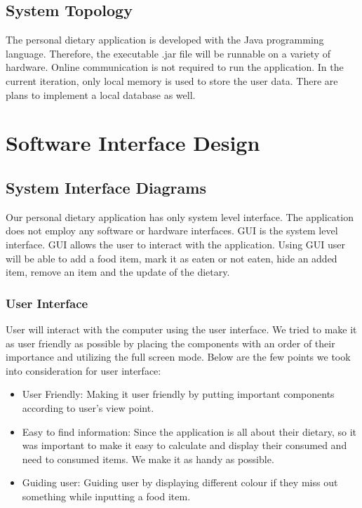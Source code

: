 \documentclass{scrreprt}
\begin{document}
\section{System Topology}

The personal dietary application is developed with the Java programming language. Therefore, the executable .jar file will be runnable on a variety of hardware. Online communication is not required to run the application. In the current iteration, only local memory is used to store the user data. There are plans to implement a local database as well.

\chapter{Software Interface Design}
\section{System Interface Diagrams}

Our personal dietary application has only system level interface. The application does not employ any software or hardware interfaces. GUI is the system level interface. GUI allows the user to interact with the application. Using GUI user will be able to add a food item, mark it as eaten or not eaten, hide an added item, remove an item and the update of the dietary.

\subsection{User Interface}

User will interact with the computer using the user interface. We tried to make it as user friendly as possible by placing the components with an order of their importance and utilizing the full screen mode. Below are the few points we took into consideration for user interface:

\begin{itemize}
\item User Friendly: Making it user friendly by putting important components according to user's view point.
\item Easy to find information: Since the application is all about their dietary, so it was important to make it easy to calculate and display their consumed and need to consumed items. We make it as handy as possible.
\item Guiding user: Guiding user by displaying different colour if they miss out something while inputting a food item.
\end{itemize}
\end{document}
